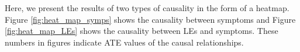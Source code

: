 Here, we present the results of two types of causality in the form of a heatmap. Figure \ref{fig:heat_map_symps} shows the causality between symptoms and Figure \ref{fig:heat_map_LEs} shows the causality between LEs and symptoms. These numbers in figures indicate ATE values of the causal relationships.





